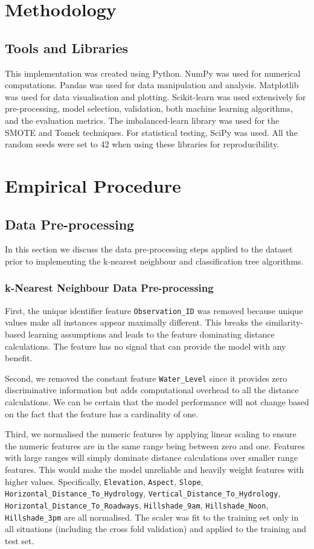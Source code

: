\documentclass[10pt, conference]{IEEEtran}
\begin{document}
\section{Methodology}
\subsection{Tools and Libraries}
This implementation was created using Python. NumPy\cite{harris2020array} was used for numerical computations. Pandas\cite{reback2020pandas} was used for data manipulation and analysis. Matplotlib\cite{Hunter:2007} was used for data visualisation and plotting. Scikit-learn\cite{scikit-learn} was used extensively for pre-processing, model selection, validation, both machine learning algorithms, and the evaluation metrics. The imbalanced-learn library\cite{JMLR:v18:16-365} was used for the SMOTE and Tomek techniques. For statistical testing, SciPy\cite{2020SciPy-NMeth} was used. All the random seeds were set to 42 when using these libraries for reproducibility.
\section{Empirical Procedure}

\subsection{Data Pre-processing}
In this section we discuss the data pre-processing steps applied to the dataset prior to implementing the k-nearest neighbour and classification tree algorithms.
\subsubsection{k-Nearest Neighbour Data Pre-processing}
First, the unique identifier feature \texttt{Observation\_ID} was removed because unique values make all instances appear maximally different. This breaks the similarity-based learning assumptions and leads to the feature dominating distance calculations. The feature has no signal that can provide the model with any benefit.

Second, we removed the constant feature \texttt{Water\_Level} since it provides zero discriminative information but adds computational overhead to all the distance calculations. We can be certain that the model performance will not change based on the fact that the feature has a cardinality of one.

Third, we normalised the numeric features by applying linear scaling to ensure the numeric features are in the same range being between zero and one. Features with large ranges will simply dominate distance calculations over smaller range features. This would make the model unreliable and heavily weight features with higher values. Specifically, \texttt{Elevation}, \texttt{Aspect}, \texttt{Slope}, \texttt{Horizontal\_Distance\_To\_Hydrology}, \texttt{Vertical\_Distance\_To\_Hydrology}, \texttt{Horizontal\_Distance\_To\_Roadways}, \texttt{Hillshade\_9am}, \texttt{Hillshade\_Noon}, \texttt{Hillshade\_3pm}
 are all normalised. The scaler was fit to the training set only in all situations (including the cross fold validation) and applied to the training and test set.
 
\end{document}
